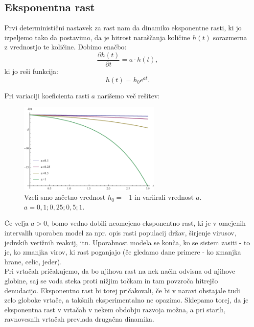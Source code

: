 \documentclass[a4paper, twoside, 12pt]{book}
\begin{document}
\subsection{Eksponentna rast}

Prvi deterministični nastavek za rast nam da dinamiko eksponentne rasti, ki jo izpeljemo tako da postavimo, da je hitrost naraščanja količine $h(t)$ sorazmerna z vrednostjo te količine. Dobimo enačbo:
    \begin{equation}
      \frac{\partial h(t)}{\partial t} = a \cdot h(t),
      \label{dinamicna-eksponentna}
    \end{equation}
ki jo reši funkcija:
    \begin{equation}
      h(t) = h_0 e^{a t}.
      \label{dinamicna-eksponentna-resitev}
    \end{equation}

Pri variaciji koeficienta rasti $a$ narišemo več rešitev:

    \begin{figure}[h]
      \begin{center}
        \includegraphics[width=7cm]{slike/eksponentna-rast}
      \end{center}
      \caption{Vzeli smo začetno vrednost $h_0 = -1$ in variirali vrednost $a$. \newline $a=0,1;0,25;0,5;1$.}
      \label{fig:eksponentna-rast}
    \end{figure}

Če velja $a > 0$, bomo vedno dobili neomejeno eksponentno rast, ki je v omejenih intervalih uporaben model za npr. opis rasti populacij držav, širjenje virusov, jedrskih verižnih reakcij, itn. Uporabnost modela se konča, ko se sistem zasiti - to je, ko zmanjka virov, ki rast poganjajo (če gledamo dane primere - ko zmanjka hrane, celic, jeder).\\
Pri vrtačah pričakujemo, da bo njihova rast na nek način odvisna od njihove globine, saj se voda steka proti nižjim točkam in tam povzroča hitrejšo denudacijo. Eksponentno rast bi torej pričakovali, če bi v naravi obstajale tudi zelo globoke vrtače, a takšnih eksperimentalno ne opazimo. Sklepamo torej, da je eksponentna rast v vrtačah v nekem obdobju razvoja možna, a pri starih, ravnovesnih vrtačah prevlada drugačna dinamika.
\end{document}
